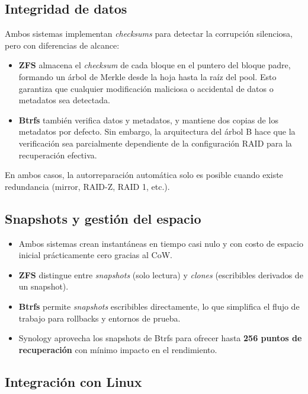 \documentclass[12pt,letterpaper]{article}
\begin{document}
\subsection{Integridad de datos}
Ambos sistemas implementan \emph{checksums} para detectar la corrupción silenciosa, pero con diferencias de
alcance:

\begin{itemize}
\item \textbf{ZFS} almacena el \emph{checksum} de cada bloque en el puntero del bloque padre, formando un árbol
  de Merkle desde la hoja hasta la raíz del pool. Esto garantiza que cualquier modificación maliciosa o
  accidental de datos o metadatos sea detectada.
\item \textbf{Btrfs} también verifica datos y metadatos, y mantiene dos copias de los metadatos por defecto.
  Sin embargo, la arquitectura del árbol B hace que la verificación sea parcialmente dependiente de la
  configuración RAID para la recuperación efectiva.
\end{itemize}

En ambos casos, la autorreparación automática solo es posible cuando existe redundancia (mirror, RAID-Z, RAID 1,
etc.).

\subsection{Snapshots y gestión del espacio}

\begin{itemize}
\item Ambos sistemas crean instantáneas en tiempo casi nulo y con costo de espacio inicial prácticamente cero
  gracias al CoW.
\item \textbf{ZFS} distingue entre \emph{snapshots} (solo lectura) y \emph{clones} (escribibles derivados de un
  snapshot).
\item \textbf{Btrfs} permite \emph{snapshots} escribibles directamente, lo que simplifica el flujo de trabajo
  para rollbacks y entornos de prueba.
\item Synology aprovecha los snapshots de Btrfs para ofrecer hasta \textbf{256 puntos de recuperación} con mínimo
  impacto en el rendimiento.
\end{itemize}

\subsection{Integración con Linux}
\end{document}
